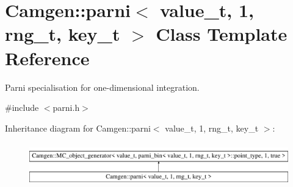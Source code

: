 \hypertarget{a00385}{\section{Camgen\-:\-:parni$<$ value\-\_\-t, 1, rng\-\_\-t, key\-\_\-t $>$ Class Template Reference}
\label{a00385}
}


Parni specialisation for one-\/dimensional integration.  




{\ttfamily \#include $<$parni.\-h$>$}

Inheritance diagram for Camgen\-:\-:parni$<$ value\-\_\-t, 1, rng\-\_\-t, key\-\_\-t $>$\-:\begin{figure}[H]
\begin{center}
\leavevmode
\includegraphics[height=1.895093cm]{a00385}
\end{center}
\end{figure}

